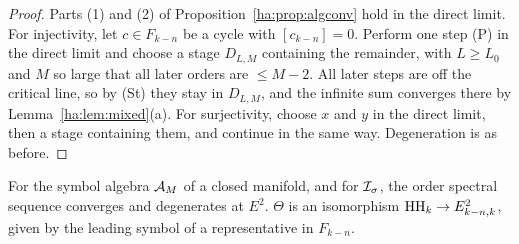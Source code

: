 \begin{proof}
Parts (1) and (2) of Proposition~\ref{ha:prop:algconv} hold in the direct
limit. For injectivity, let \(c\in F_{k-n}\) be a cycle with
\([c_{k-n}]=0\). Perform one step (P) in the direct limit and choose a
stage \(D_{L,M}\) containing the remainder, with \(L\ge L_0\) and \(M\)
so large that all later orders are \(\le M-2\). All later steps are off
the critical line, so by (St) they stay in \(D_{L,M}\), and the infinite
sum converges there by Lemma~\ref{ha:lem:mixed}(a). For surjectivity,
choose \(x\) and \(y\) in the direct limit, then a stage containing them,
and continue in the same way. Degeneration is as before.
\end{proof}

\begin{theorem}\label{ha:thm:conv}
For the symbol algebra \(\mathcal A_M\) of a closed manifold, and for \(\mathcal I_\sigma\),
the order spectral sequence converges and degenerates at \(E^2\).
\(\Theta\) is an isomorphism \(\operatorname{HH}_k\to E^2_{k-n,k}\), given by the leading
symbol of a representative in \(F_{k-n}\).
\end{theorem}

